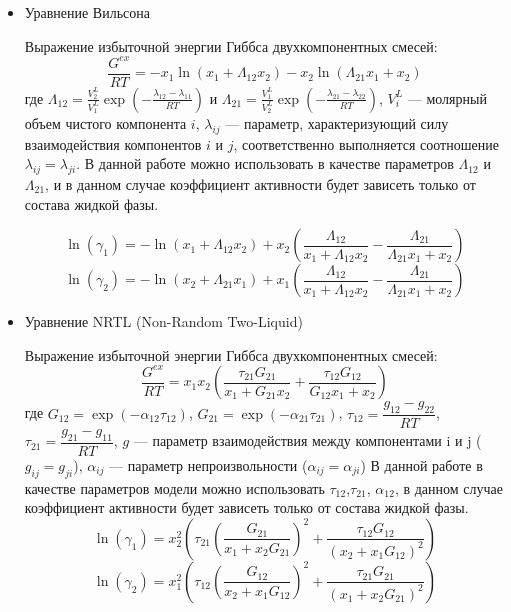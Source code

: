 \begin{itemize}
	\item Уравнение Вильсона
	
	Выражение избыточной энергии Гиббса двухкомпонентных смесей:
	\begin{equation}\label{eq.phase.wilson}
	\frac{G^{ex}}{RT}=-x_1 \ln(x_1+\Lambda_{12} x_2)-x_2 \ln(\Lambda_{21} x_1 +x_2)
	\end{equation}
	где $\Lambda_{12}=\frac{V_2^L}{V_1^L}\exp\left(-\frac{\lambda_{12}-\lambda_{11}}{RT} \right)$ и $\Lambda_{21}=\frac{V_1^L}{V_2^L}\exp\left(-\frac{\lambda_{21}-\lambda_{22}}{RT}\right)$,  $V_i^L$ --- молярный объем чистого компонента $i$, $\lambda_{ij}$ --- параметр, характеризующий силу взаимодействия компонентов $i$ и $j$, соответственно выполняется соотношение $\lambda_{ij}=\lambda_{ji}$. В данной работе можно использовать в качестве параметров $\Lambda_{12}$ и $\Lambda_{21}$, и в данном случае коэффициент активности будет зависеть только от состава жидкой фазы.
	
	\begin{equation}
	\ln(\gamma_1)=-\ln(x_1 + \Lambda_{12} x_2) + x_2 \left( \dfrac{\Lambda_{12}}{x_1 + \Lambda_{12} x_2 } - \dfrac{\Lambda_{21}}{\Lambda_{21} x_1+x_2} \right)
	\end{equation}
	\begin{equation}
	\ln(\gamma_2)=-\ln(x_2 + \Lambda_{21} x_1) + x_1 \left( \dfrac{\Lambda_{12}}{x_1 + \Lambda_{12} x_2 } - \dfrac{\Lambda_{21}}{\Lambda_{21} x_1+x_2} \right)
	\end{equation} 
	
	\item Уравнение NRTL (Non-Random Two-Liquid)
	
	Выражение избыточной энергии Гиббса двухкомпонентных смесей:
	\begin{equation}\label{eq.phase.nrtl}
	\dfrac{G^{ex}}{RT}=x_1 x_2 \left( \dfrac{\tau_{21}G_{21}}{x_1 + G_{21} x_2} + \dfrac{\tau_{12} G_{12}}{G_{12} x_1 +x_2} \right)
	\end{equation}
	где $G_{12}=\exp(-\alpha_{12} \tau_{12})$,  $G_{21}=\exp(-\alpha_{21} \tau_{21})$, $\tau_{12}=\dfrac{g_{12}-g_{22}}{RT}$, $\tau_{21}=\dfrac{g_{21}-g_{11}}{RT}$, $g$ --- параметр взаимодействия между компонентами i и j ($g_{ij}=g_{ji}$), $\alpha_{ij}$ --- параметр непроизвольности ($\alpha_{ij}=\alpha_{ji}$)
	В данной работе в качестве параметров модели можно использовать $\tau_{12}$,$\tau_{21}$, $\alpha_{12}$, в данном случае коэффициент активности будет зависеть только от состава жидкой фазы.
	\begin{equation}
	\ln(\gamma_1)=x^2_2 \left( \tau_{21} \left(\dfrac{G_{21}}{x_1+x_2 G_{21}}\right)^2 + \dfrac{\tau_{12} G_{12}}{(x_2+x_1 G_{12})^2} \right)
	\end{equation}
	\begin{equation}
	\ln(\gamma_2)=x^2_1 \left( \tau_{12} \left(\dfrac{G_{12}}{x_2+x_1 G_{12}}\right)^2 + \dfrac{\tau_{21} G_{21}}{(x_1+x_2 G_{21})^2} \right)
	\end{equation} 
\end{itemize}

